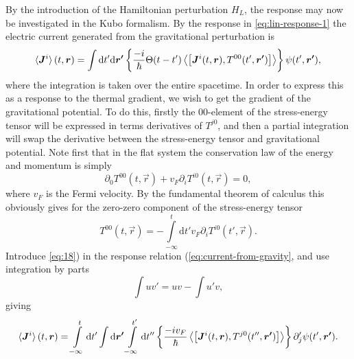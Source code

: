 By the introduction of the Hamiltonian perturbation $H_L$, the response may now be investigated in the Kubo formalism.
By the response in \cref{eq:lin-response-1} the electric current generated from the gravitational perturbation is
\begin{equation}
  \label{eq:current-from-gravity}
  \braket{\bm{J}^i}(t, \bm{r}) =
\int \mathrm{d}t' \mathrm{d} \bm{r'} \left\{
  \frac{-i}{\hbar} \Theta(t-t') \Braket{\left[
\bm{J}^i(t, \bm{r}), T^{00}(t', \bm{r'})
    \right]}
\right\} 
\psi (t', \bm{r'}),
\end{equation}
where the integration is taken over the entire spacetime.
In order to express this as a response to the thermal gradient, we wish to get the gradient of the gravitational potential.
To do this, firstly the $00$-element of the stress-energy tensor will be expressed in terms derivatives of $T^{j0}$, and then a partial integration will swap the derivative between the stress-energy tensor and gravitational potential.
Note first that in the flat system the conservation law of the  energy and momentum is simply
\begin{equation}
  \partial _0 T^{00}(t, \vec{r}) + v_F \partial _i T^{i0} (t, \vec{r}) = 0,
\end{equation}
where $v_F$ is the Fermi velocity.
By the fundamental theorem of calculus this obviously gives for the zero-zero component of the stress-energy tensor
\begin{equation}
  \label{eq:18}
  T^{00}(t, \vec{r}) = - \int\limits_{-\infty }^t \mathrm{d}t'
  v_F \partial _i T^{i 0}(t', \vec{r}).
\end{equation}
Introduce \cref{eq:18}) in the response relation (\ref{eq:current-from-gravity}, and use integration by parts
\begin{equation}
  \int u v' = uv - \int u' v,
\end{equation}
giving
\begin{equation}\label{eq:current-luttinger-gravity-final}
  \braket{\bm{J}^i}(t, \bm{r}) =
  \int\limits_{-\infty}^{t} \mathrm{d}t'
  \int \mathrm{d} \bm{r'}
  \int\limits_{-\infty }^{t'} \mathrm{d}t''
  \left\{
    \frac{-i v_{F}}{\hbar} \Braket{\left[
        \bm{J}^i(t, \bm{r}), T^{j0}(t'', \bm{r'})
      \right]}
  \right\} 
  \partial'_j \psi (t', \bm{r'}).
\end{equation}
